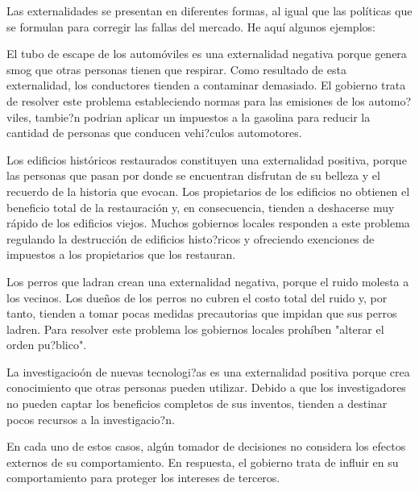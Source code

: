 \begin{ejemplos}
	Las externalidades se presentan en diferentes formas, al igual que las políticas que se formulan para corregir las fallas del mercado. He aquí algunos ejemplos:
	\begin{ejemplo}
		El tubo de escape de los automóviles es una externalidad negativa porque genera smog que otras personas tienen que respirar. Como resultado de esta externalidad, los conductores tienden a contaminar demasiado. El gobierno trata de resolver este problema estableciendo normas para las emisiones de los automo?viles, tambie?n podrian aplicar un impuestos a la gasolina para reducir la cantidad de personas que conducen vehi?culos automotores.
	\end{ejemplo}
	\begin{ejemplo}
	Los edificios históricos restaurados constituyen una externalidad positiva, porque las personas que pasan por donde se encuentran disfrutan de su belleza y el recuerdo de la historia que evocan. Los propietarios de los edificios no obtienen el beneficio total de la restauración y, en consecuencia, tienden a deshacerse muy rápido de los edificios viejos. Muchos gobiernos locales responden a este problema regulando la destrucción de edificios histo?ricos y ofreciendo exenciones de impuestos a los propietarios que los restauran.
    \end{ejemplo}

	\begin{ejemplo}
	Los perros que ladran crean una externalidad negativa, porque el ruido molesta a los vecinos. Los dueños de los perros no cubren el costo total del ruido y, por tanto, tienden a tomar pocas medidas precautorias que impidan que sus perros ladren. Para resolver este problema los gobiernos locales prohíben "alterar el orden pu?blico".
	\end{ejemplo}

	\begin{ejemplo}
	La investigacioón de nuevas tecnologi?as es una externalidad positiva porque crea conocimiento que otras personas pueden utilizar. Debido a que los investigadores no pueden captar los beneficios completos de sus inventos, tienden a destinar pocos recursos a la investigacio?n.
	\end{ejemplo}
En cada uno de estos casos, algún tomador de decisiones no considera los efectos externos de su comportamiento. En respuesta, el gobierno trata de influir en su comportamiento para proteger los intereses de terceros.
\end{ejemplos}

